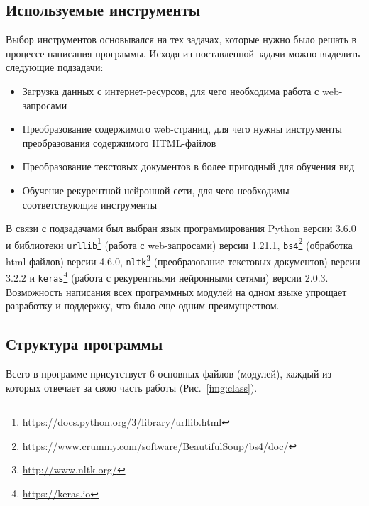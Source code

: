 \documentclass[14pt]{matmex-diploma-custom}
\begin{document}
\subsection{Используемые инструменты}

Выбор инструментов основывался на тех задачах, которые нужно было решать в процессе написания программы. Исходя из поставленной задачи можно выделить следующие подзадачи:

\begin{itemize}
\item Загрузка данных с интернет-ресурсов, для чего необходима работа с web-запросами
\item Преобразование содержимого web-страниц, для чего нужны инструменты преобразования содержимого HTML-файлов
\item Преобразование текстовых документов в более пригодный для обучения вид
\item Обучение рекурентной нейронной сети, для чего необходимы соответствующие инструменты
\end{itemize}

В связи с подзадачами был выбран язык программирования Python версии 3.6.0 и библиотеки \texttt{urllib}\footnote{\url{https://docs.python.org/3/library/urllib.html}} (работа с web-запросами) версии 1.21.1, \texttt{bs4}\footnote{\url{https://www.crummy.com/software/BeautifulSoup/bs4/doc/}} (обработка html-файлов) версии 4.6.0, \texttt{nltk}\footnote{\url{http://www.nltk.org/}}\cite{tools:nltk} (преобразование текстовых документов) версии 3.2.2 и \texttt{keras}\footnote{\url{https://keras.io}}\cite{tools:keras} (работа с рекурентными нейронными сетями) версии 2.0.3. Возможность написания всех программных модулей на одном языке упрощает разработку и поддержку, что было еще одним преимуществом.

\subsection{Структура программы}

Всего в программе присутствует 6 основных файлов (модулей), каждый из которых отвечает за свою часть работы (Рис.~\ref{img:class}).
\end{document}

